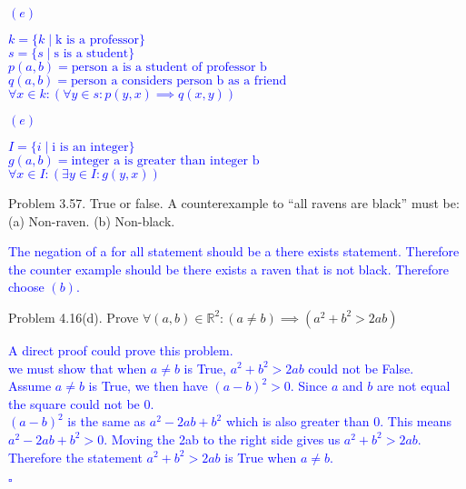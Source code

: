 \documentclass{article}
\begin{document}
\begin{addmargin}[2em]{2em}
 	 \textcolor{blue}{
 		$(e)$
 		\begin{addmargin}[4em]{0em}
 			$k=\{k \mid \text{k is a professor}\}$\\
 			$s = \{s \mid \text{s is a student}\} $\\
 			$p(a,b) = \text{person a is a student of professor b}$\\
 			$q(a,b) = \text{person a considers person b as a friend}$\\
 			$\forall x \in k : (\forall y \in s : p(y,x) \implies q(x,y))$
 		\end{addmargin}
 	}
 
	 \textcolor{blue}{
	 	$(e)$
	 	\begin{addmargin}[4em]{0em}
	 		$I = \{i \mid \text{i is an integer} \}$\\
	 		$g(a,b) = \text{integer a is greater than integer b}$\\
	 		$\forall x \in I : (\exists y \in I:g(y,x))$
	 	\end{addmargin}
 }
\end{addmargin}


\clearpage

\begin{addmargin}[2em]{2em}
	Problem 3.57. True or false. A counterexample to “all ravens are black” must be: (a) Non-raven. (b) Non-black.
	
	\textcolor{blue}{
		\begin{addmargin}[2em]{2em}
			The negation of a for all statement should be a there exists statement. Therefore the counter example should be there exists a raven that is not black. Therefore choose $(b)$.
		\end{addmargin}
	}
\end{addmargin}

\clearpage
\begin{addmargin}[2em]{2em}
	Problem 4.16(d). Prove $\forall (a,b) \in \mathbb{R}^2:(a \neq b) \implies (a^2 + b^2 > 2ab ) $\\
	\textcolor{blue}{
		\begin{addmargin}[2em]{1em}
			A direct proof could prove this problem.\\
			we must show that when $a \neq b$ is True, $a^2+b^2 > 2ab$ could not be False.\\
			Assume $a \neq b$ is True, we then have $(a-b)^2 > 0$. Since $a$ and $b$ are not equal the square could not be $0$.\\
			$(a-b)^2$ is the same as $a^2 -2ab +b^2$ which is also greater than 0. This means $a^2 - 2ab +b^2 > 0$. Moving the 2ab to the right side gives us $a^2+b^2 > 2ab$.\\
			Therefore the statement $a^2 + b^2 > 2ab$ is True when $a \neq b$.
			\begin{flushright}
				$\square$
			\end{flushright}
		\end{addmargin}
}
\end{addmargin}
\end{document}
